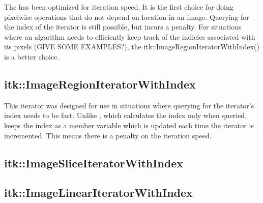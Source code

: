 The  has been optimized for iteration speed.  It
is the first choice for doing pixelwise operations that do not depend on
location in an image.  Querying for the index of the iterator is still
possible, but incurs a penalty.  For situations where an algorithm needs to
efficiently keep track of the indicies associated with its pixels (GIVE SOME
EXAMPLES?), the itk::ImageRegionIteratorWithIndex() is a better choice.

\subsection{itk::ImageRegionIteratorWithIndex}
\label{sec:itkImageRegionIteratorWithIndex}
This iterator was designed for use in situations where querying for the
iterator's index needs to be fast.  Unlike ,
which calculates the index only when queried,
 keeps the index as a member variable
which is updated each time the iterator is incremented.  This means there is a
penalty on the iteration speed.

%





\subsection{itk::ImageSliceIteratorWithIndex}
\label{sec:itkImageSliceIteratorWithIndex}

\subsection{itk::ImageLinearIteratorWithIndex}
\label{sec:itkImageLinearIteratorWithIndex}

